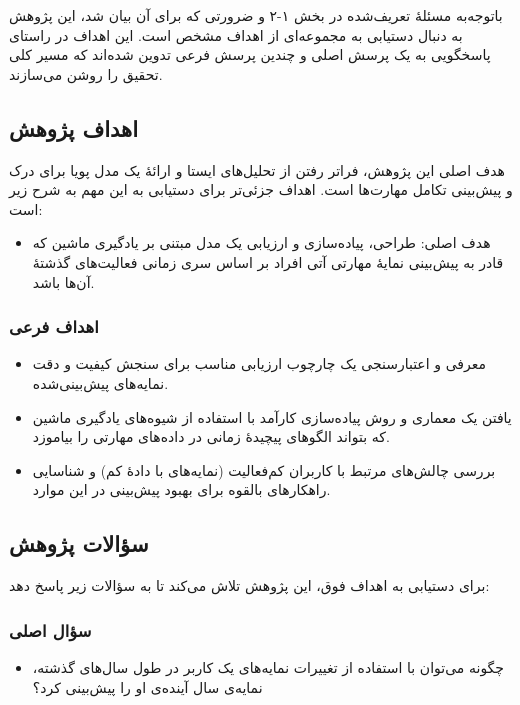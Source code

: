 باتوجه‌به مسئلهٔ تعریف‌شده در بخش ۱-۲ و ضرورتی که برای آن بیان شد، این پژوهش به دنبال دستیابی به مجموعه‌ای از اهداف مشخص است. این اهداف در راستای پاسخگویی به یک پرسش اصلی و چندین پرسش فرعی تدوین شده‌اند که مسیر کلی تحقیق را روشن می‌سازند.

\subsection{اهداف پژوهش}

هدف اصلی این پژوهش، فراتر رفتن از تحلیل‌های ایستا و ارائهٔ یک مدل پویا برای درک و پیش‌بینی تکامل مهارت‌ها است. اهداف جزئی‌تر برای دستیابی به این مهم به شرح زیر است:

\begin{itemize}
    \item هدف اصلی: طراحی، پیاده‌سازی و ارزیابی یک مدل مبتنی بر یادگیری ماشین که قادر به پیش‌بینی نمایهٔ مهارتی آتی افراد بر اساس سری زمانی فعالیت‌های گذشتهٔ آن‌ها باشد.
\end{itemize}

\subsubsection*{اهداف فرعی}
\begin{itemize}
    \item معرفی و اعتبارسنجی یک چارچوب ارزیابی مناسب برای سنجش کیفیت و دقت نمایه‌های پیش‌بینی‌شده.
    \item یافتن یک معماری و روش پیاده‌سازی کارآمد با استفاده از شیوه‌های یادگیری ماشین که بتواند الگوهای پیچیدهٔ زمانی در داده‌های مهارتی را بیاموزد.
    \item بررسی چالش‌های مرتبط با کاربران کم‌فعالیت (نمایه‌های با دادهٔ کم) و شناسایی راهکارهای بالقوه برای بهبود پیش‌بینی در این موارد.
\end{itemize}

\subsection{سؤالات پژوهش}

برای دستیابی به اهداف فوق، این پژوهش تلاش می‌کند تا به سؤالات زیر پاسخ دهد:

\subsubsection*{سؤال اصلی}
\begin{itemize}
    \item چگونه می‌توان با استفاده از تغییرات نمایه‌های یک کاربر در طول سال‌های گذشته، نمایه‌ی سال آینده‌ی او را پیش‌بینی کرد؟
\end{itemize}

